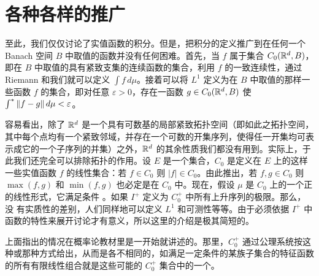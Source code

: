 \section{各种各样的推广}
至此，我们仅仅讨论了实值函数的积分。但是，把积分的定义推广到在任何一个 Banach 空间 $B$ 中取值的函数并没有任何困难。首先，当 $f$ 属于集合 $C_0(\mathbb R^d,B)$，即在 $B$ 中取值的具有紧致支集的连续函数的集合，利用 $f$ 的一致连续性，通过 Riemann 和我们就可以定义 $\int f\,d\mu$。接着可以将 $L^1$ 定义为在 $B$ 中取值的那样一些函数 $f$ 的集合，即对任意 $\varepsilon>0$，存在一函数 $g\in C_0(\mathbb R^d,B)$ 使 $\int^{*}\|f-g\|\,d\mu<\varepsilon$。

容易看出，除了 $\mathbb R^d$ 是一个具有可数基的局部紧致拓扑空间（即如此之拓扑空间，其中每个点均有一个紧致邻域，并存在一个可数的开集序列，使得任一开集均可表示成它的一个子序列的并集）之外，$\mathbb R^d$ 的其余性质我们都没有用到。实际上，于此我们还完全可以排除拓扑的作用。设 $E$ 是一个集合，$C_0$ 是定义在 $E$ 上的这样一些实值函数 $f$ 的线性集合：若 $f\in C_0$ 则 $|f|\in C_0$。由此推出，若 $f,g\in C_0$ 则 $\max(f,g)$ 和 $\min(f,g)$ 也必定是在 $C_0$ 中。现在，假设 $\mu$ 是 $C_0$ 上的一个正的线性形式，它满足条件 。如果 $I^+$ 定义为 $C_0^+$ 中所有上升序列的极限。那么，没
有实质性的差别，人们同样地可以定义 $L^1$ 和可测性等等。由于必须依据 $I^+$ 中函数的特性来展开讨论才有意义，所以这里的介绍是极其简短的。

上面指出的情况在概率论教材里是一开始就讲述的。那里，$C_0^+$ 通过公理系统按这种或那种方式给出，从而是各不相同的，如满足一定条件的某族子集合的特征函数的所有有限线性组合就是这些可能的 $C_0^+$ 集合中的一个。
